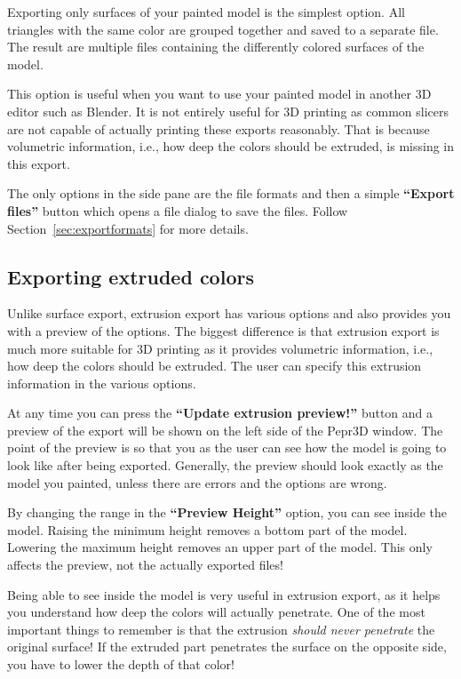 Exporting only surfaces of your painted model is the simplest option.
All triangles with the same color are grouped together and saved to a separate file.
The result are multiple files containing the differently colored surfaces of the model.

This option is useful when you want to use your painted model in another 3D editor such as Blender.
It is not entirely useful for 3D printing as common slicers are not capable of actually printing these exports reasonably.
That is because volumetric information, i.e., how deep the colors should be extruded, is missing in this export.

The only options in the side pane are the file formats and then a simple \textbf{``Export files''} button which opens a file dialog to save the files.
Follow Section~\ref{sec:exportformats} for more details.

\subsection{Exporting extruded colors}

Unlike surface export, extrusion export has various options and also provides you with a preview of the options.
The biggest difference is that extrusion export is much more suitable for 3D printing as it provides volumetric information, i.e., how deep the colors should be extruded.
The user can specify this extrusion information in the various options.

At any time you can press the \textbf{``Update extrusion preview!''} button and a preview of the export will be shown on the left side of the Pepr3D window.
The point of the preview is so that you as the user can see how the model is going to look like after being exported.
Generally, the preview should look exactly as the model you painted, unless there are errors and the options are wrong.

By changing the range in the \textbf{``Preview Height''} option, you can see inside the model.
Raising the minimum height removes a bottom part of the model.
Lowering the maximum height removes an upper part of the model.
This only affects the preview, not the actually exported files!

Being able to see inside the model is very useful in extrusion export, as it helps you understand how deep the colors will actually penetrate.
One of the most important things to remember is that the extrusion \emph{should never penetrate} the original surface!
If the extruded part penetrates the surface on the opposite side, you have to lower the depth of that color!


